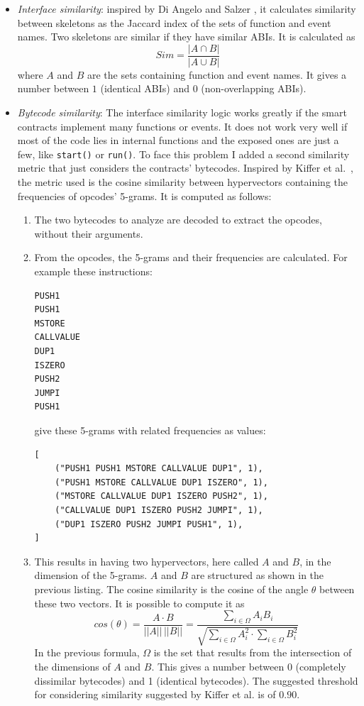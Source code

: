 \begin{itemize}
    \item \textit{Interface similarity}: inspired by Di Angelo and Salzer \cite{clustering-sc}, it calculates similarity between skeletons as the Jaccard index of the sets of function and event names. Two skeletons are similar if they have similar ABIs. It is calculated as 
    \begin{equation}
	Sim = \frac{|A\cap B|}{|A\cup B|}
    \end{equation}
    where $A$ and $B$ are the sets containing function and event names. It gives a number between $1$ (identical ABIs) and $0$ (non-overlapping ABIs).
    
    \item \textit{Bytecode similarity}: The interface similarity logic works greatly if the smart contracts implement many functions or events. It does not work very well if most of the code lies in internal functions and the exposed ones are just a few, like \texttt{start()} or \texttt{run()}. 
    To face this problem I added a second similarity metric that just considers the contracts' bytecodes. Inspired by Kiffer et al.~\cite{ethereum-sc-topology}, the metric used is the cosine similarity between hypervectors containing the frequencies of opcodes' 5-grams. It is computed as follows:
    \begin{enumerate}
        \item The two bytecodes to analyze are decoded to extract the opcodes, without their arguments.
        \item From the opcodes, the 5-grams and their frequencies are calculated. For example these instructions: 
        \begin{lstlisting}
PUSH1
PUSH1
MSTORE
CALLVALUE
DUP1
ISZERO
PUSH2
JUMPI
PUSH1\end{lstlisting}
        give these 5-grams with related frequencies as values:
        \begin{lstlisting}
[
    ("PUSH1 PUSH1 MSTORE CALLVALUE DUP1", 1),
    ("PUSH1 MSTORE CALLVALUE DUP1 ISZERO", 1),
    ("MSTORE CALLVALUE DUP1 ISZERO PUSH2", 1),
    ("CALLVALUE DUP1 ISZERO PUSH2 JUMPI", 1),
    ("DUP1 ISZERO PUSH2 JUMPI PUSH1", 1),
]       \end{lstlisting}
        \item This results in having two hypervectors, here called $A$ and $B$, in the dimension of the 5-grams. $A$ and $B$ are structured as shown in the previous listing. The cosine similarity is the cosine of the angle $\theta$ between these two vectors. It is possible to compute it as 
        \[
        cos(\theta)=\frac{A \cdot B}{||A||\,||B||}=\frac{\sum\limits_{i\in\Omega}A_iB_i}{ \sqrt{\sum\limits_{i\in\Omega}A^2_i \cdot \sum\limits_{i\in\Omega}B^2_i} }
        \]
        In the previous formula, $\Omega$ is the set that results from the intersection of the dimensions of $A$ and $B$.
        This gives a number between 0 (completely dissimilar bytecodes) and 1 (identical bytecodes). The suggested threshold for considering similarity suggested by Kiffer et al. is of $0.90$.
    \end{enumerate}
\end{itemize}

